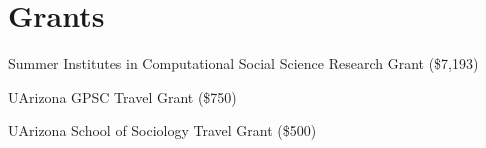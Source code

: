 \section*{Grants}
 Summer Institutes in Computational Social Science Research Grant (\$7,193)

 UArizona GPSC Travel Grant (\$750)

 UArizona School of Sociology Travel Grant (\$500)
